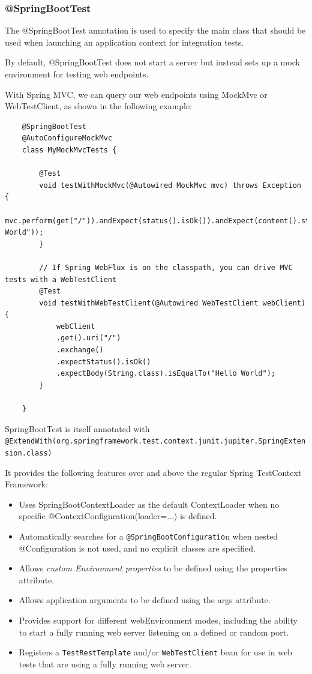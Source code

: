 \documentclass{scrartcl}
\begin{document}
\subsubsection{@SpringBootTest}

The @SpringBootTest annotation is used to specify the main class that should be used when launching an application context for integration tests.

By default, @SpringBootTest does not start a server but instead sets up a mock environment for testing web endpoints.

With Spring MVC, we can query our web endpoints using MockMvc or WebTestClient, as shown in the following example:

\begin{lstlisting}
    @SpringBootTest
    @AutoConfigureMockMvc
    class MyMockMvcTests {

        @Test
        void testWithMockMvc(@Autowired MockMvc mvc) throws Exception {
            mvc.perform(get("/")).andExpect(status().isOk()).andExpect(content().string("Hello World"));
        }

        // If Spring WebFlux is on the classpath, you can drive MVC tests with a WebTestClient
        @Test
        void testWithWebTestClient(@Autowired WebTestClient webClient) {
            webClient
            .get().uri("/")
            .exchange()
            .expectStatus().isOk()
            .expectBody(String.class).isEqualTo("Hello World");
        }

    }

\end{lstlisting}

SpringBootTest is itself annotated with
\lstinline|@ExtendWith(org.springframework.test.context.junit.jupiter.SpringExtension.class)|

It provides the following features over and above the regular Spring TestContext Framework:

\begin{itemize}
    \item Uses SpringBootContextLoader as the default ContextLoader when no specific @ContextConfiguration(loader=...) is defined.
    \item Automatically searches for a \lstinline|@SpringBootConfiguratio|n when nested @Configuration is not used, and no explicit classes are specified.
    \item Allows \textit{custom Environment properties} to be defined using the properties attribute.
    \item Allows application arguments to be defined using the args attribute.
    \item Provides support for different webEnvironment modes, including the ability to start a fully running web server listening on a defined or random port.
    \item Registers a \lstinline|TestRestTemplate| and/or \lstinline|WebTestClient| bean for use in web tests that are using a fully running web server.
\end{itemize}
\end{document}
